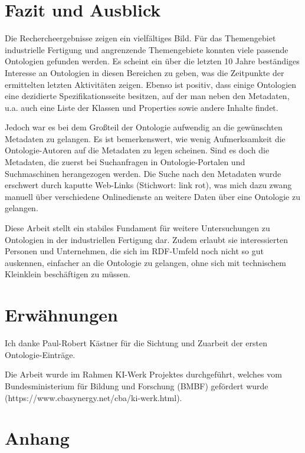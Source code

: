 \documentclass{article}
\begin{document}
\section{Fazit und Ausblick}

Die Rechercheergebnisse zeigen ein vielfältiges Bild.
Für das Themengebiet industrielle Fertigung und angrenzende Themengebiete konnten viele passende Ontologien gefunden werden.
Es scheint ein über die letzten 10 Jahre beständiges Interesse an Ontologien in diesen Bereichen zu geben, was die Zeitpunkte der ermittelten letzten Aktivitäten zeigen.
Ebenso ist positiv, dass einige Ontologien eine dezidierte Spezifikationsseite besitzen, auf der man neben den Metadaten, u.a. auch eine Liste der Klassen und Properties sowie andere Inhalte findet.

Jedoch war es bei dem Großteil der Ontologie aufwendig an die gewünschten Metadaten zu gelangen.
Es ist bemerkenswert, wie wenig Aufmerksamkeit die Ontologie-Autoren auf die Metadaten zu legen scheinen.
Sind es doch die Metadaten, die zuerst bei Suchanfragen in Ontologie-Portalen und Suchmaschinen herangezogen werden.
Die Suche nach den Metadaten wurde erschwert durch kaputte Web-Links (Stichwort: link rot), was mich dazu zwang manuell über verschiedene Onlinedienste an weitere Daten über eine Ontologie zu gelangen.

Diese Arbeit stellt ein stabiles Fundament für weitere Untersuchungen zu Ontologien in der industriellen Fertigung dar. Zudem erlaubt sie interessierten Personen und Unternehmen, die sich im RDF-Umfeld noch nicht so gut auskennen, einfacher an die Ontologie zu gelangen, ohne sich mit technischem Kleinklein beschäftigen zu müssen.


\section{Erwähnungen}

Ich danke Paul-Robert Kästner für die Sichtung und Zuarbeit der ersten Ontologie-Einträge.

Die Arbeit wurde im Rahmen KI-Werk Projektes durchgeführt, welches vom Bundesministerium für Bildung und Forschung (BMBF) gefördert wurde (https://www.cbasynergy.net/cba/ki-werk.html).

\newpage

\section{Anhang}
\end{document}

